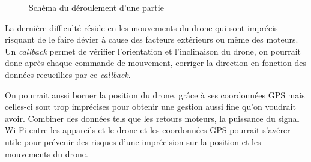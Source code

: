 \begin{figure}[ht]
\begin{center}
\end{center}
\caption{Schéma du déroulement d'une partie}
\end{figure}

La dernière difficulté réside en les mouvements du drone qui sont imprécis risquant de le faire dévier à cause des facteurs extérieurs ou même des moteurs. Un \textit{callback} permet de vérifier l'orientation et l'inclinaison du drone, on pourrait donc après chaque commande de mouvement, corriger la direction en fonction des données recueillies par ce \textit{callback}.

On pourrait aussi borner la position du drone, grâce à ses coordonnées GPS mais celles-ci sont trop imprécises pour obtenir une gestion aussi fine qu'on voudrait avoir. Combiner des données tels que les retours moteurs, la puissance du signal Wi-Fi entre les appareils et le drone et les coordonnées GPS pourrait s'avérer utile pour prévenir des risques d'une imprécision sur la position et les mouvements du drone.
